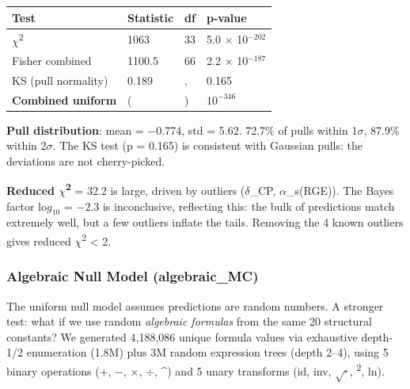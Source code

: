 \documentclass[11pt,a4paper]{article}
\begin{document}
\begin{longtable}[]{@{}llll@{}}
\toprule\noalign{}
Test & Statistic & df & p-value \\
\midrule\noalign{}
\endhead
\bottomrule\noalign{}
\endlastfoot
\(\chi\)\textsuperscript{2} & 1063 & 33 & 5.0 \(\times\)
10\(^{-202}\) \\
Fisher combined & 1100.5 & 66 & 2.2 \(\times\) 10\(^{-187}\) \\
KS (pull normality) & 0.189 &, & 0.165 \\
\textbf{Combined uniform} & (&) & \textbf{\(10^{-346}\)} \\
\end{longtable}


\textbf{Pull distribution}: mean = \(- 0\).774, std = 5.62. 72.7\% of
pulls within 1\(\sigma\), 87.9\% within 2\(\sigma\). The KS test (p =
0.165) is consistent with Gaussian pulls: the deviations are not
cherry-picked.

\textbf{Reduced \(\chi\)\textsuperscript{2}} = 32.2 is large, driven by
outliers (\(\delta\)\_CP, \(\alpha\)\_s(RGE)). The Bayes factor
lo\(g_{10}\) = \(- 2\).3 is inconclusive, reflecting this: the bulk of
predictions match extremely well, but a few outliers inflate the tails.
Removing the 4 known outliers gives reduced \(\chi\)\textsuperscript{2}
\textless{} 2.

\subsubsection{Algebraic Null Model (algebraic\_MC)}

The uniform null model assumes predictions are random numbers. A
stronger test: what if we use random \emph{algebraic formulas} from the
same 20 structural constants? We generated 4,188,086 unique formula
values via exhaustive depth-1/2 enumeration (1.8M) plus 3M random
expression trees (depth 2--4), using 5 binary operations (+, \(-\),
\(\times\), \(\div\), \^{}) and 5 unary transforms (id, inv, $\sqrt{\cdot}$,
\textsuperscript{2}, ln).
\end{document}
